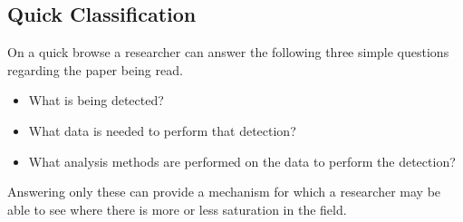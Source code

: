 \subsection{Quick Classification}
On a quick browse a researcher can answer the following three simple questions regarding the paper being read. 
\begin{itemize}
    \item What is being detected? 
    \item What data is needed to perform that detection?
    \item What analysis methods are performed on the data to perform the detection?
\end{itemize}
Answering only these can provide a mechanism for which a researcher may be able to see where there is more or less saturation in the field.
